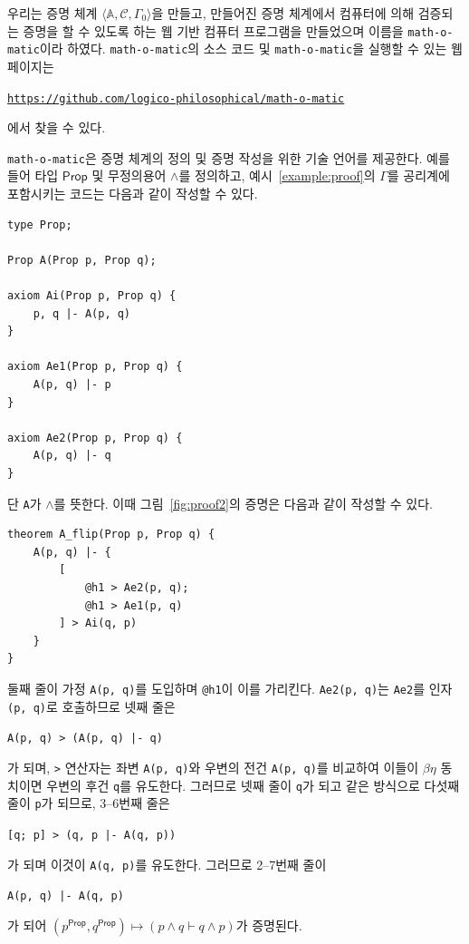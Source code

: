 \documentclass[10pt,twocolumn]{article}
\theoremstyle{definition}
\newcommand{\Prop}{\mathsf{Prop}}
\begin{document}
우리는 증명 체계 $\langle\mathbb A, \mathcal C, \Gamma_0\rangle$을 만들고, 만들어진 증명 체계에서 컴퓨터에 의해 검증되는 증명을 할 수 있도록 하는 웹 기반 컴퓨터 프로그램을 만들었으며 이름을 \texttt{math-o-matic}이라 하였다. \texttt{math-o-matic}의 소스 코드 및 \texttt{math-o-matic}을 실행할 수 있는 웹 페이지는
\begin{center}\small
	\href{https://github.com/logico-philosophical/math-o-matic}{\texttt{https://github.com/logico-philosophical/math-o-matic}}
\end{center}
에서 찾을 수 있다.

\texttt{math-o-matic}은 증명 체계의 정의 및 증명 작성을 위한 기술 언어를 제공한다. 예를 들어 타입 $\Prop$ 및 무정의용어 $\land$를 정의하고, 예시~\ref{example:proof}의 $\Gamma$를 공리계에 포함시키는 코드는 다음과 같이 작성할 수 있다.

\begin{lstlisting}
type Prop;

Prop A(Prop p, Prop q);

axiom Ai(Prop p, Prop q) {
	p, q |- A(p, q)	
}

axiom Ae1(Prop p, Prop q) {
	A(p, q) |- p
}

axiom Ae2(Prop p, Prop q) {
	A(p, q) |- q	
}
\end{lstlisting}
단 \verb!A!가 $\land$를 뜻한다. 이때 그림~\ref{fig:proof2}의 증명은 다음과 같이 작성할 수 있다.
\begin{lstlisting}
theorem A_flip(Prop p, Prop q) {
	A(p, q) |- {
		[
			@h1 > Ae2(p, q);
			@h1 > Ae1(p, q)
		] > Ai(q, p)
	}
}
\end{lstlisting}
둘째 줄이 가정 \verb!A(p, q)!를 도입하며 \verb!@h1!이 이를 가리킨다. \verb!Ae2(p, q)!는 \verb!Ae2!를 인자 \verb!(p, q)!로 호출하므로 넷째 줄은
\begin{center}
	\verb!A(p, q) > (A(p, q) |- q)!
\end{center}
가 되며, \verb!>! 연산자는 좌변 \verb!A(p, q)!와 우변의 전건 \verb!A(p, q)!를 비교하여 이들이 $\beta\eta$ 동치이면 우변의 후건 \verb!q!를 유도한다. 그러므로 넷째 줄이 \verb!q!가 되고 같은 방식으로 다섯째 줄이 \verb!p!가 되므로, 3--6번째 줄은
\begin{center}
	\verb![q; p] > (q, p |- A(q, p))!
\end{center}
가 되며 이것이 \verb!A(q, p)!를 유도한다. 그러므로 2--7번째 줄이
\begin{center}
	\verb!A(p, q) |- A(q, p)!
\end{center}
가 되어 $(p^\Prop, q^\Prop)\mapsto (p\land q\vdash q\land p)$가 증명된다.
\end{document}
